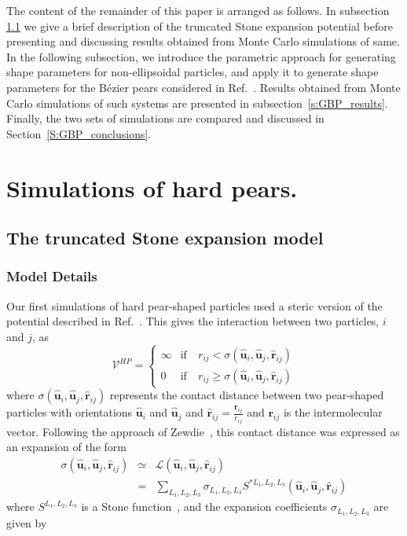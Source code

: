 \documentclass[%
reprint,
superscriptaddress,
showpacs,
 amsmath,amssymb,
 aps,
floatfix,
]{revtex4-1}
\newcommand{\vect}[1]{ \mathbf{#1} }
\newcommand{\vecth}[1]{ \mathbf{\hat{#1} } }
\newcommand{\rij}{\vecth{r}_{ij}}
\newcommand{\ui}{\vecth{u}_i}
\newcommand{\uj}{\vecth{u}_j}
\newcommand{\sijr}{\sigma(\ui,\uj,\rij)}
\begin{document}
The content of the remainder of this paper is arranged as follows. In subsection \ref{s:Stone}
we give a brief description of the truncated Stone expansion potential before presenting and discussing
results obtained from Monte Carlo simulations of same. In the following subsection, we introduce
the parametric approach for generating shape parameters for non-ellipsoidal particles, and apply
it to generate shape parameters for the B\'{e}zier pears considered in
Ref.~\cite{Berardi_Ricci_01}. Results obtained from Monte Carlo simulations of such systems are
presented in subsection~\ref{s:GBP_results}. Finally, the two sets of simulations are compared
and discussed in Section~\ref{S:GBP_conclusions}.



\section{Simulations of hard pears.}
\subsection{The truncated Stone expansion model}
\label{s:Stone}
\subsubsection{Model Details}
Our first simulations of hard pear-shaped particles used a steric
version of the potential described in Ref.~\cite{Berardi_Ricci_01}. This gives the interaction
between two particles, $i$ and $j$, as %
\begin{equation}
    \mathcal{V}^{HP} = \left\{  %
    \begin{array}{ccc}
        \infty  &\mathrm{if\ }  &r_{ij} < \sijr \\
        0   &\mathrm{if\ }  &r_{ij} \geq \sijr
    \end{array}
    \right.
\end{equation}
%
where $\sijr$ represents the contact distance between two pear-shaped particles with
orientations $\vecth{u}_i$ and $\vecth{u}_j$ and $\vecth{r}_{ij} = \frac{\vect{r}_{ij}}{r_{ij}}$
and $\vect{r}_{ij}$ is the intermolecular vector.
Following the approach of Zewdie~\cite{Zewdie98a,Zewdie98b}, this
contact distance was expressed as an expansion of the form
\begin{eqnarray}
\label{eqn:Stone_sigma1}
    \sijr   &\simeq&  \mathcal{L}(\vecth{u}_i,\vecth{u}_j,\vecth{r}_{ij}) \nonumber \\
        &=& \sum_{L_1,L_2,L_3}\sigma_{L_1, L_2, L_3}S^{*L_1, L_2, L_3}
        (\vecth{u}_i,\vecth{u}_j,\vecth{r}_{ij})
\end{eqnarray}
%
where $S^{L_1, L_2, L_3}$ is a Stone function~\cite{Stone}, and the expansion coefficients
$\sigma_{L_1, L_2, L_3}$ are given by
\end{document}
